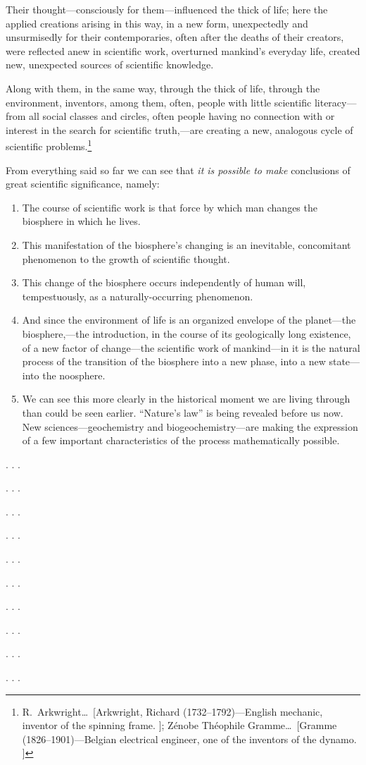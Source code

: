 Their thought---consciously for them---influenced the thick of life; here the
applied creations arising in this way, in a new form, unexpectedly and
unsurmisedly for their contemporaries, often after the deaths of their
creators, were reflected anew in scientific work, overturned mankind's everyday
life,  created new, unexpected sources of scientific
knowledge.

Along with them, in the same way, through the thick of life, through the
environment, inventors, among them, often, people with little scientific
literacy---from all social classes and circles, often people having no
connection with or interest in the search for scientific truth,---are creating
a new, analogous cycle of scientific problems.\footnote{%
	R.\ Arkwright\dots\ [Arkwright, Richard (1732--1792)---English
	mechanic, inventor of the spinning frame. ]; Zénobe
	Théophile Gramme\dots\ [Gramme (1826--1901)---Belgian electrical
	engineer, one of the inventors of the dynamo. ]
}


\Section %
From everything said so far we can see that \emph{it is possible to make}
conclusions of great scientific significance, namely:
\begin{enumerate}
  \item The course of scientific work is that force by which man changes the
  	biosphere in which he lives.
  \item This manifestation of the biosphere's changing is an inevitable,
  	concomitant phenomenon to the growth of scientific thought.
  \item This change of the biosphere occurs independently of human will,
  	tempestuously, as a naturally-occurring phenomenon.
  \item And since the environment of life is an organized envelope of the
  	planet---the biosphere,---the introduction, in the course of its
	geologically long existence, of a new factor of change---the scientific
	work of mankind---in it is the natural process of the transition of the
	biosphere into a new phase, into a new state---into the noosphere.
  \item We can see this more clearly in the historical moment we are living
  	through than could be seen earlier.  ``Nature's law'' is being revealed
	before us now.  New sciences---geochemistry and biogeochemistry---are
	making the expression of a few important characteristics of the process
	mathematically possible.
\end{enumerate}


\Section %

. . .

\Section %

. . .

\Section %

. . .

\Section %

. . .

\Section %

. . .

\Section %

. . .

\Section %

. . .

\Section %

. . .

\Section %

. . .

\Section %

. . .

